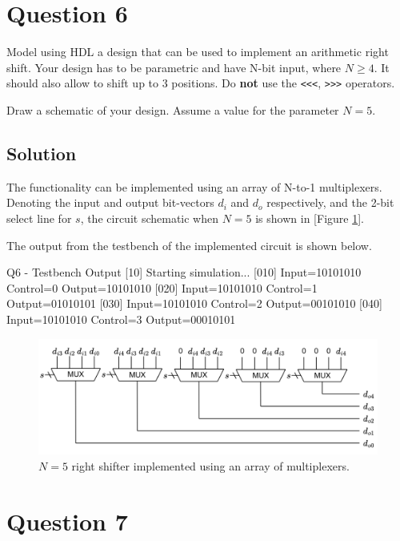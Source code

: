 \documentclass[../main.tex]{subfiles}
\begin{document}
\section{Question 6}

Model using HDL a design that can be used to implement an arithmetic right shift. Your design has to be parametric and have N-bit input, where $N \geq 4$. It should also allow to shift up to 3 positions. Do \textbf{not} use the \texttt{<<<}, \texttt{>>>} operators.

Draw a schematic of your design. Assume a value for the parameter $N = 5$.

\subsection*{Solution}

The functionality can be implemented using an array of N-to-1 multiplexers. Denoting the input and output bit-vectors $d_i$ and $d_o$ respectively, and the 2-bit select line for $s$, the circuit schematic when $N = 5$ is shown in [Figure \ref{q6}].

The output from the testbench of the implemented circuit is shown below.

\begin{mintedterminal}{Q6 - Testbench Output}
[10] Starting simulation...
[010] Input=10101010 Control=0 Output=10101010
[020] Input=10101010 Control=1 Output=01010101
[030] Input=10101010 Control=2 Output=00101010
[040] Input=10101010 Control=3 Output=00010101
\end{mintedterminal}

\begin{figure}[h]
    \centering
    \includegraphics[width=1.0\linewidth]{assets/q6.png}
    \caption{$N = 5$ right shifter implemented using an array of multiplexers.}
    \label{q6}
\end{figure}

\newpage

\section{Question 7}
\end{document}
